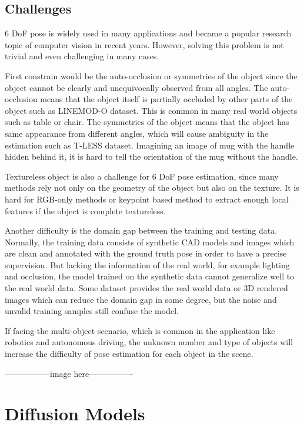 \documentclass[12pt,DIV14,BCOR12mm,a4paper,footinclude=false,headinclude,parskip=half-,twoside,openright,cleardoublepage=empty,toc=index,bibliography=totoc,listof=totoc]{scrreprt}
\numberwithin{equation}{chapter}
\begin{document}
\subsection{Challenges}
6 DoF pose is widely used in many applications and became a popular research topic of computer vision in recent years. However, solving this problem is not trivial and even challenging in many cases.

First constrain would be the auto-occlusion or symmetries of the object since the object cannot be clearly and unequivocally observed from all angles\cite{maru2022}. The auto-occlusion means that the object itself is partially occluded by other parts of the object such as LINEMOD-O dataset\cite{dataV4MUMX2020}. This is common in many real world objects such as table or chair. The symmetries of the object means that the object has same appearance from different angles, which will cause ambiguity in the estimation such as T-LESS dataset\cite{hodan2017tless}. Imagining an image of mug with the handle hidden behind it, it is hard to tell the orientation of the mug without the handle.

Textureless object is also a challenge for 6 DoF pose estimation, since many methods rely not only on the geometry of the object but also on the texture. It is hard for RGB-only methods\cite{kendall2016posenet} or keypoint based method\cite{pavlakos20176dof} to extract enough local features if the object is complete textureless.

Another difficulty is the domain gap between the training and testing data. Normally, the training data consists of synthetic CAD models and images which are clean and annotated with the ground truth pose in order to have a precise supervision. But lacking the information of the real world, for example lighting and occlusion, the model trained on the synthetic data cannot generalize well to the real world data. Some dataset provides the real world data or 3D rendered images which can reduce the domain gap in some degree\cite{hodan2019photorealistic}, but the noise and unvalid training samples still confuse the model.

If facing the multi-object scenario, which is common in the application like robotics and autonomous driving, the unknown number and type of objects will increase the difficulty of pose estimation for each object in the scene.

-----------------image here----------------

\section{Diffusion Models}
\end{document}
